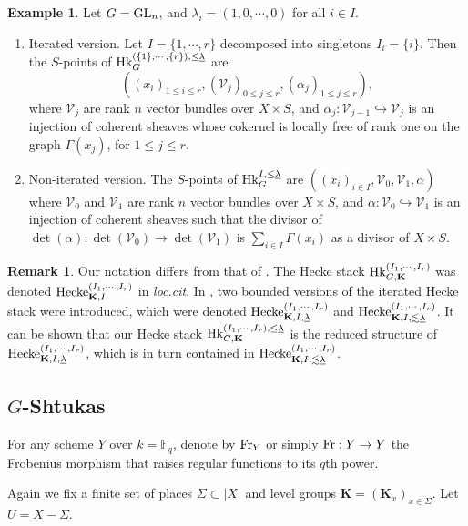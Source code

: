 \documentclass[11pt]{amsart}
\numberwithin{equation}{section}
\theoremstyle{plain}
\theoremstyle{definition}
\newtheorem{remark}[subsubsection]{Remark}
\newtheorem{exam}[subsubsection]{Example}
\def\FF{\mathbb{F}}
\newcommand\cV{\mathcal{V}}
\def\bK{\mathbf{K}}
\newcommand\Fr{\textup{Fr}}
\newcommand{\Hk}{\textup{Hk}}
\newcommand\GL{\textup{GL}}
\newcommand{\incl}{\hookrightarrow}
\newcommand\un{\underline}
\renewcommand\a\alpha
\newcommand\G\Gamma
\newcommand{\Sig}{\Sigma}
\renewcommand{\l}{\lambda}
\begin{document}
\begin{exam} Let $G=\GL_{n}$, and $\l_{i}=(1,0,\cdots, 0)$ for all $i\in I$. 
\begin{enumerate}
\item Iterated version. Let $I=\{1,\cdots, r\}$ decomposed into singletons $I_{i}=\{i\}$. Then the $S$-points of $\Hk^{(\{1\},\cdots,\{ r\}),\le\un\l}_{G}$ are 
$$((x_{i})_{1\le i\le r}, (\cV_{j})_{0\le j\le r}, (\a_{j})_{1\le j\le r}),$$
where $\cV_{j}$ are rank $n$ vector bundles over $X\times S$, and $\a_{j}: \cV_{j-1}\incl \cV_{j}$ is an injection of coherent sheaves whose cokernel is locally free of rank one on the graph $\G(x_{j})$, for $1\le j\le r$.

\item Non-iterated version. The $S$-points of $\Hk^{I,\le\un\l}_{G}$ are $((x_{i})_{i\in I}, \cV_{0}, \cV_{1}, \a)$ where $\cV_{0}$ and $\cV_{1}$ are rank $n$ vector bundles over $X\times S$, and $\a: \cV_{0}\incl \cV_{1}$ is an injection of coherent sheaves such that the divisor of $\det(\a): \det(\cV_{0})\to \det(\cV_{1})$ is  $\sum_{i\in I}\G(x_{i})$ as a divisor of $X\times S$.
\end{enumerate}

\end{exam}


\begin{remark} Our notation differs from that of \cite[\S1]{VLaff}. The Hecke stack $\Hk^{(I_{1},\cdots, I_{r})}_{G,\bK}$ was denoted $\textup{Hecke}_{\bK,I}^{(I_{1},\cdots, I_{r})}$ in {\em loc.cit}.  In \cite[Definition 1.2]{VLaff}, two bounded versions of the iterated Hecke stack were introduced, which were denoted $\textup{Hecke}^{(I_{1},\cdots, I_{r})}_{\bK, I, \un\l}$ and $\textup{Hecke}^{(I_{1},\cdots, I_{r})}_{\bK, I, \lesssim\un\l}$.  It can be shown that our Hecke stack $\Hk^{(I_{1},\cdots, I_{r}),\le\un\l}_{G, \bK}$ is the reduced structure of $\textup{Hecke}^{(I_{1},\cdots, I_{r})}_{\bK, I, \un\l}$, which is in turn contained in $\textup{Hecke}^{(I_{1},\cdots, I_{r})}_{\bK, I, \lesssim\un\l}$. 
\end{remark}

\subsection{$G$-Shtukas}\label{ss:Sht}
For any scheme $Y$ over $k=\FF_{q}$, denote by $\Fr_{Y}$ or simply $\Fr:Y\to Y$ the Frobenius morphism that raises regular functions to its $q$th power.

Again we fix a finite set of places $\Sigma\subset |X|$ and level groups $\bK=(\bK_{x})_{x\in \Sig}$.  Let $U=X-\Sigma$.
\end{document}
